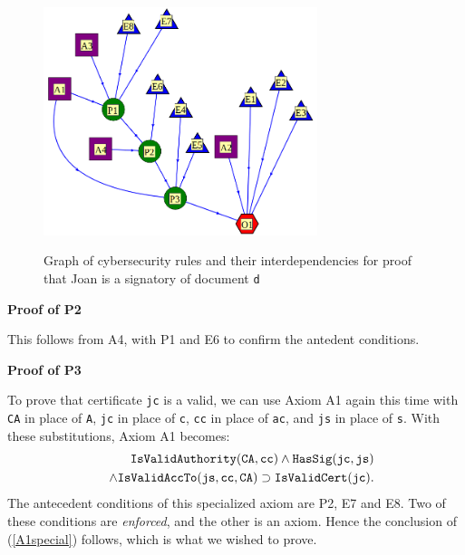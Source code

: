 \begin{figure}[bhpt]
	\begin{centering}
		\leavevmode\includegraphics[width=8cm]{figures/rigorous_certificate.png}\ \\
			\caption{Graph of cybersecurity rules and their interdependencies for 
			proof that Joan is a signatory of document {\tt d}}\label{certificaterulesgraph}
	\end{centering}
		\vspace{-5mm}
\end{figure}

{\bf Proof of P2}

This follows from A4, with P1 and E6 to confirm the antedent conditions.

{\bf Proof of P3}

To prove that  certificate {\tt jc} is a valid, we can use Axiom A1 again
this time with {\tt CA} in place of {\tt A}, {\tt jc} in place of {\tt c}, 
{\tt cc} in place of {\tt ac}, 
and {\tt js} in place of {\tt s}.
With these substitutions,
Axiom A1 becomes:
\begin{eqnarray}\label{A2specific2} \nonumber
&&	\hbox{\tt IsValidAuthority}({\tt CA},{\tt cc}) \wedge \hbox{\tt HasSig}({\tt jc},{\tt js})\\ \nonumber
&&\wedge \hbox{\tt IsValidAccTo}({\tt js}, {\tt cc}, {\tt CA} ) 
\supset \hbox{\tt IsValidCert}({\tt jc}).
\end{eqnarray}
The antecedent conditions of this specialized axiom are
P2, E7 and E8. Two of these conditions are {\em enforced}, and the other is
an axiom. Hence the conclusion of (\ref{A1special}) follows, which
is what we wished to prove.

